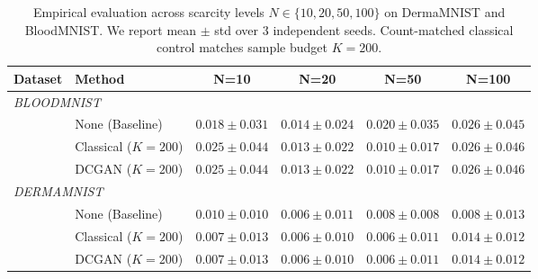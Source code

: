 \begin{table}[t]
\centering
\caption{Empirical evaluation across scarcity levels $N \in \{10, 20, 50, 100\}$ on DermaMNIST and BloodMNIST. We report mean $\pm$ std over 3 independent seeds. Count-matched classical control matches sample budget $K=200$.}
\label{tab:rq1_main_results}
\small
\begin{tabular}{llcccc}
\toprule
\textbf{Dataset} & \textbf{Method} & \textbf{N=10} & \textbf{N=20} & \textbf{N=50} & \textbf{N=100} \\
\midrule
\multicolumn{6}{l}{\textit{BLOODMNIST}} \\
 & None (Baseline) & $0.018 \pm 0.031$ & $0.014 \pm 0.024$ & $0.020 \pm 0.035$ & $0.026 \pm 0.045$ \\
 & Classical ($K=200$) & $0.025 \pm 0.044$ & $0.013 \pm 0.022$ & $0.010 \pm 0.017$ & $0.026 \pm 0.046$ \\
 & DCGAN ($K=200$) & $0.025 \pm 0.044$ & $0.013 \pm 0.022$ & $0.010 \pm 0.017$ & $0.026 \pm 0.046$ \\
\midrule
\multicolumn{6}{l}{\textit{DERMAMNIST}} \\
 & None (Baseline) & $0.010 \pm 0.010$ & $0.006 \pm 0.011$ & $0.008 \pm 0.008$ & $0.008 \pm 0.013$ \\
 & Classical ($K=200$) & $0.007 \pm 0.013$ & $0.006 \pm 0.010$ & $0.006 \pm 0.011$ & $0.014 \pm 0.012$ \\
 & DCGAN ($K=200$) & $0.007 \pm 0.013$ & $0.006 \pm 0.010$ & $0.006 \pm 0.011$ & $0.014 \pm 0.012$ \\
\midrule
\bottomrule
\end{tabular}
\end{table}